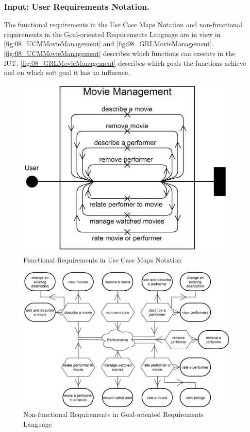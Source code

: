 \subsubsection{Input: User Requirements Notation.}
The functional requirements in the Use Case Maps Notation and non-functional requirements in the Goal-oriented Requirements Language are in view in \autoref{fig:08_UCMMovieManagement} and \autoref{fig:08_GRLMovieManagement}. \autoref{fig:08_UCMMovieManagement} describes which functions can execute in the IUT. \autoref{fig:08_GRLMovieManagement} describes which goals the functions achieve and on which soft goal it has an influence. 
\begin{figure}[h]
	\centering
	\includegraphics[scale=0.29]{../images/08/08_UCMMovieManagement.jpg} 
	\caption{Functional Requirements in Use Case Maps Notation}
	\label{fig:08_UCMMovieManagement}
\end{figure}
\begin{figure}[h]
	\centering
	\includegraphics[scale=0.4]{../images/08/08_GRLMovieManagement.jpg} 
	\caption{Non-functional Requirements in Goal-oriented Requirements Language}
	\label{fig:08_GRLMovieManagement}
\end{figure}

